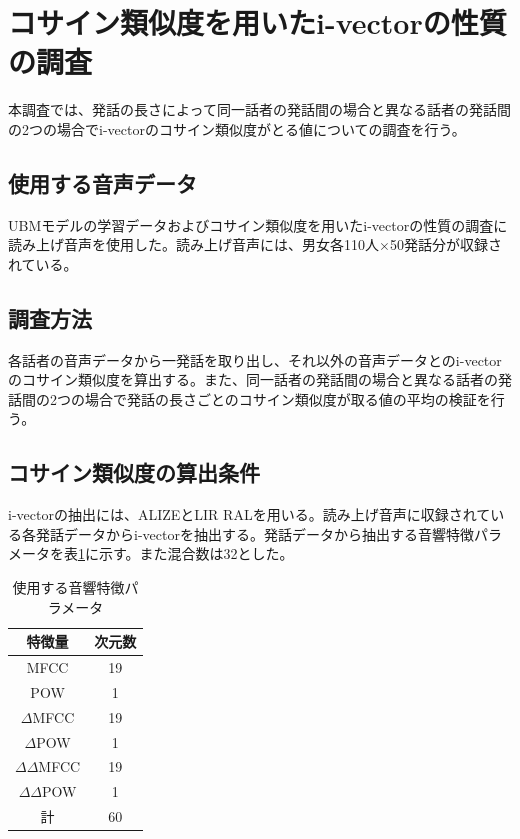 \section{コサイン類似度を用いたi-vectorの性質の調査}
\label{section:pre_cos}
本調査では、発話の長さによって同一話者の発話間の場合と異なる話者の発話間の2つの場合でi-vectorのコサイン類似度がとる値についての調査を行う。

\subsection{使用する音声データ}
\label{section:detail_ATR}
UBMモデルの学習データおよびコサイン類似度を用いたi-vectorの性質の調査に読み上げ音声\cite{ATR}を使用した。読み上げ音声には、男女各110人$×$50発話分が収録されている。

\subsection{調査方法}
各話者の音声データから一発話を取り出し、それ以外の音声データとのi-vectorのコサイン類似度を算出する。また、同一話者の発話間の場合と異なる話者の発話間の2つの場合で発話の長さごとのコサイン類似度が取る値の平均の検証を行う。\par

\subsection{コサイン類似度の算出条件}
i-vectorの抽出には、ALIZEとLIR RAL\cite{alize}を用いる。読み上げ音声に収録されている各発話データからi-vectorを抽出する。発話データから抽出する音響特徴パラメータを表\ref{iv_feature}に示す。また混合数は32とした。

\begin{table}[H]
  \begin{center}
    \caption{使用する音響特徴パラメータ}
    \label{iv_feature}
    \begin{tabular}{|c||c|} \hline
      特徴量 & 次元数\\ \hline
      MFCC & 19  \\ 
      POW & 1  \\ 
      $\Delta$MFCC & 19 \\ 
      $\Delta$POW & 1 \\ 
      $\Delta\Delta$MFCC & 19 \\ 
      $\Delta\Delta$POW & 1 \\ \hline
      計 & 60 \\ \hline
    \end{tabular}
  \end{center}
\end{table}

